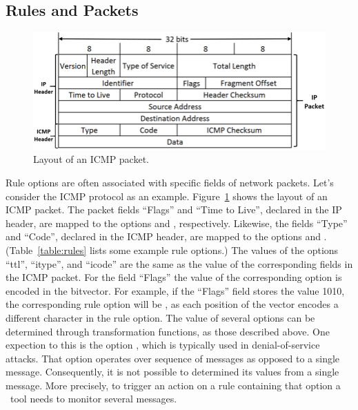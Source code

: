 \documentclass[sigconf,anonymous]{acmart}
\begin{document}
\subsection{Rules and Packets}
\label{sec:rules-and-packets}

\begin{figure}[h!]
\centering
\includegraphics[scale=0.28]{figs/ICMP-packet-structure.png}
\caption{Layout of an ICMP packet.}
\label{fig:icmp-packet-layout}
\end{figure}

Rule options are often associated with specific fields of network
packets. Let's consider the ICMP protocol as an
example. Figure~\ref{fig:icmp-packet-layout} shows the layout of an
ICMP packet. The packet fields ``Flags'' and ``Time to Live'',
declared in the IP header, are mapped to the options 
and , respectively. Likewise, the fields ``Type'' and
``Code'', declared in the ICMP header, are mapped to the options
 and . (Table~\ref{table:rules} lists some
example rule options.) The values of the options ``ttl'', ``itype'',
and ``icode'' are the same as the value of the corresponding fields in
the ICMP packet. For the field ``Flags'' the value of the
corresponding option is encoded in the bitvector. For example, if the
``Flags'' field stores the value 1010, the corresponding rule option
will be , as each position of the vector encodes a
different character in the  rule option. The value of
several options can be determined through transformation functions, as
those described above. One expection to this is the option
, which is typically used in denial-of-service
attacks. That option operates over sequence of messages as opposed to
a single message. Consequently, it is not possible to determined its
values from a single message. More precisely, to trigger an action on
a rule containing that option a \nids\ tool needs to monitor several
messages.
\end{document}
